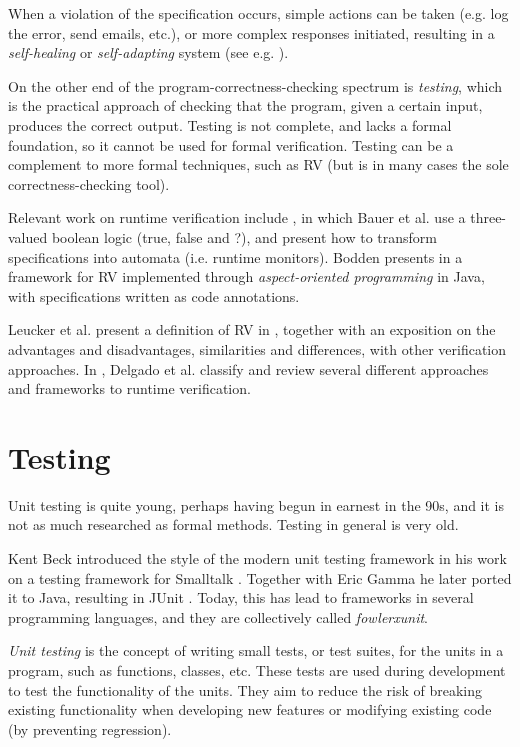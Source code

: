 \documentclass[a4paper,11pt]{kth-mag}
\begin{document}
When a violation of the specification occurs, simple actions can be taken (e.g.
log the error, send emails, etc.), or more complex responses initiated,
resulting in a \textit{self-healing} or \textit{self-adapting} system (see e.g.
\cite{huebscher08}).

On the other end of the program-correctness-checking spectrum is
\emph{testing}, which is the practical approach of checking that the program,
given a certain input, produces the correct output.  Testing is not complete,
and lacks a formal foundation, so it cannot be used for formal verification.
Testing can be a complement to more formal techniques, such as RV (but is in
many cases the sole correctness-checking tool).

Relevant work on runtime verification include \cite{bauer06}, in which Bauer et
al. use a three-valued boolean logic (true, false and ?), and present how to
transform specifications into automata (i.e. runtime monitors). Bodden presents
in \cite{bodden05efficientrv} a framework for RV implemented through
\emph{aspect-oriented programming} \cite{aspectj} in Java, with specifications
written as code annotations.

Leucker et al. present a definition of RV in \cite{leucker09abriefaccount},
together with an exposition on the advantages and disadvantages, similarities
and differences, with other verification approaches. In
\cite{delgado04taxonomy}, Delgado et al. classify and review several different
approaches and frameworks to runtime verification.


\section{Testing}

Unit testing is quite young, perhaps having begun in earnest in the 90s, and it
is not as much researched as formal methods. Testing in general is very old.

Kent Beck introduced the style of the modern unit testing framework in his work
on a testing framework  for Smalltalk \cite{becksmalltalktesting}.  Together
with Eric Gamma he later ported it to Java, resulting in JUnit \cite{junit}.
Today, this has lead to frameworks in several programming languages, and they
are collectively called \textit{fowlerxunit}.

\textit{Unit testing} is the concept of writing small tests, or test suites,
for the units in a program, such as functions, classes, etc. These tests are
used during development to test the functionality of the units. They aim to
reduce the risk of breaking existing functionality when developing new features
or modifying existing code (by preventing regression).
\end{document}
